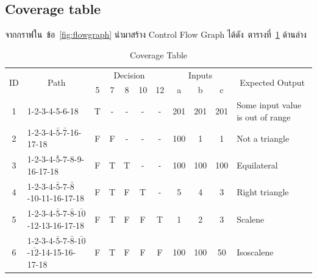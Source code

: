 \documentclass[12pt,a4paper]{article}
\newcommand{\outbound}{Some input value is out of range}
\newcommand{\nottriangle}{Not a triangle}
\newcommand{\equ}{Equilateral}
\newcommand{\sca}{Scalene}
\newcommand{\iso}{Isoscalene}
\newcommand{\numbername}{ข้อ}
\newcommand{\righttri}{Right triangle}
\renewcommand{\tablename}{ตารางที่}
\begin{document}
\newpage
\clearpage
\begin{landscape}
    \section{Coverage table}
    จากกราฟใน~\numbername~\ref{fig:flowgraph} นำมาสร้าง Control Flow Graph ได้ดัง~\tablename~\ref{tab:coveragetable} ด้านล่าง
    \label{sec:coveragetable}
    \begin{table}[hb!]
        \caption{Coverage Table}
        \label{tab:coveragetable}
        \begin{center}
            \begin{tabular}[p]{ | c | l | *{8}{c|} l |}
                \hline
                \multirow{2}{*}{ID} & \multicolumn{1}{c}{\multirow{2}{*}{Path}} & \multicolumn{5}{|c|}{Decision} & \multicolumn{3}{|c|}{Inputs} & \multicolumn{1}{c|}{\multirow{2}{*}{Expected Output}} \\ \cline{3-10}
                                    &                                                   & 5  & 7  & 8  & 10 & 12 & a   & b   & c   &                \\ \hline
                1 & 1-2-3-4-5-6-18                                                      & T  & -  & -  & -  & -  & 201 & 201 & 201 & \outbound      \\ \hline
                2 & 1-2-3-4-$\bar{5}$-$\bar{7}$-16-17-18                                & F  & F  & -  & -  & -  & 100 &   1 &   1 & \nottriangle   \\ \hline
                3 & 1-2-3-4-$\bar{5}$-7-8-9-16-17-18                                    & F  & T  & T  & -  & -  & 100 & 100 & 100 & \equ           \\ \hline
                4 & 1-2-3-4-$\bar{5}$-7-$\bar{8}$-10-11-16-17-18                        & F  & T  & F  & T  & -  &   5 &   4 &   3 & \righttri      \\ \hline
                5 & 1-2-3-4-$\bar{5}$-7-$\bar{8}$-$\bar{10}$-12-13-16-17-18             & F  & T  & F  & F  & T  &   1 &   2 &   3 & \sca           \\ \hline
                6 & 1-2-3-4-$\bar{5}$-7-$\bar{8}$-$\bar{10}$-$\bar{12}$-14-15-16-17-18  & F  & T  & F  & F  & F  & 100 & 100 &  50 & \iso           \\ \hline
            \end{tabular}
        \end{center}
    \end{table}

\end{landscape}
\end{document}

